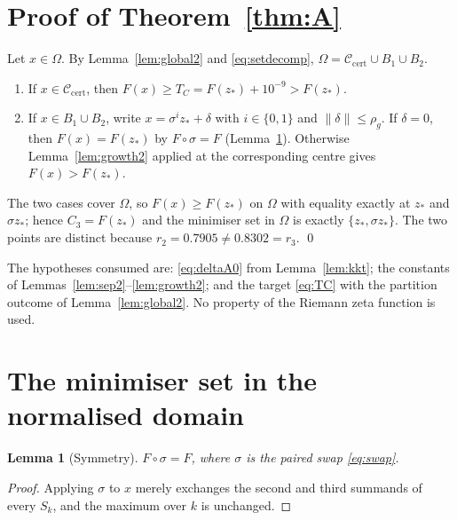 \documentclass[11pt]{article}
\newtheorem{lemma}[theorem]{Lemma}
\theoremstyle{remark}
\newcommand{\Om}{\Omega}
\begin{document}
\section{Proof of Theorem~\ref{thm:A}}\label{sec:proof}

Let $x\in\Om$. By Lemma~\ref{lem:global2} and \eqref{eq:setdecomp},
$\Om=\mathcal C_{\mathrm{cert}}\cup B_1\cup B_2$.

\begin{enumerate}
\item If $x\in\mathcal C_{\mathrm{cert}}$, then $F(x)\ge T_C=F(z_*)+10^{-9}>F(z_*)$.
\item If $x\in B_1\cup B_2$, write $x=\sigma^{i}z_*+\delta$ with $i\in\{0,1\}$ and $\|\delta\|\le\rho_g$.
If $\delta=0$, then $F(x)=F(z_*)$ by $F\circ\sigma=F$ (Lemma~\ref{lem:symmetry}). Otherwise
Lemma~\ref{lem:growth2} applied at the corresponding centre gives $F(x)>F(z_*)$.
\end{enumerate}

The two cases cover $\Om$, so $F(x)\ge F(z_*)$ on $\Om$ with equality exactly at $z_*$ and $\sigma z_*$;
hence $C_3=F(z_*)$ and the minimiser set in $\Om$ is exactly $\{z_*,\sigma z_*\}$. The two points are
distinct because $r_2=0.7905\ne0.8302=r_3$. \qed

The hypotheses consumed are: \eqref{eq:deltaA0} from Lemma~\ref{lem:kkt}; the constants of
Lemmas~\ref{lem:sep2}--\ref{lem:growth2}; and the target \eqref{eq:TC} with the partition outcome of
Lemma~\ref{lem:global2}. No property of the Riemann zeta function is used.

\section{The minimiser set in the normalised domain}\label{sec:orbit}

\begin{lemma}[Symmetry]\label{lem:symmetry}
$F\circ\sigma=F$, where $\sigma$ is the paired swap \eqref{eq:swap}.
\end{lemma}

\begin{proof}
Applying $\sigma$ to $x$ merely exchanges the second and third summands of every $S_k$, and the maximum
over $k$ is unchanged.
\end{proof}
\end{document}
